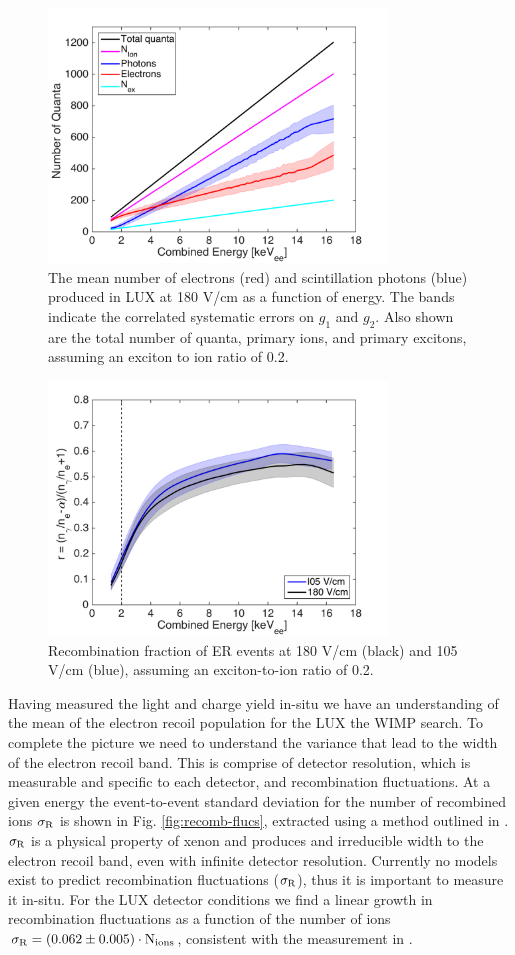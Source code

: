 \begin{figure}[h!]\centering
\includegraphics[width=90mm]{fig/quanta-vs-energy.png}
\caption{The mean number of electrons (red) and scintillation photons (blue) produced in LUX at 180 V/cm as a function of energy. The bands indicate the correlated systematic errors on $g_1$ and $g_2$. Also shown are the total number of quanta, primary ions, and primary excitons, assuming an exciton to ion ratio of 0.2. }
\label{fig:quanta-vs-energy}
\end{figure}


\begin{figure}[h!]\centering
\includegraphics[width=90mm]{fig/recombination.png}
\caption{Recombination fraction of ER events at 180 V/cm (black) and 105 V/cm (blue), assuming an exciton-to-ion ratio of 0.2.}
\label{fig:recombination}
\end{figure}

Having measured the light and charge yield in-situ we have an understanding of the mean of the electron recoil population for the LUX the WIMP search. To complete the picture we need to understand the variance that lead to the width of the electron recoil band. This is comprise of detector resolution, which is measurable and specific to each detector, and recombination fluctuations. At a given energy the event-to-event standard deviation for the number of recombined ions $\rm \sigma_R$ is shown in Fig. \ref{fig:recomb-flucs}, extracted using a method outlined in \cite{Dobi_Thesis}. $\rm \sigma_R$ is a physical property of xenon and produces and irreducible width to the electron recoil band, even with infinite detector resolution. Currently no models exist to predict recombination fluctuations ($\rm \sigma_R$), thus it is important to measure it in-situ. For the LUX detector conditions we find a linear growth in recombination fluctuations as a function of the number of ions $\rm \sigma_R = (0.062 \pm 0.005)\cdot N_{ions}$, consistent with the measurement in \cite{Dobi_Thesis}.

